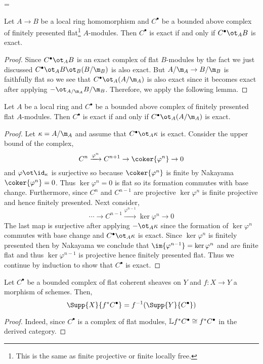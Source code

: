 =\documentclass[12pt]{article}
\begin{document}
\begin{lemma}
Let $A \to B$ be a local ring homomorphism and $C^\bullet$ be a bounded above complex of finitely presented flat\footnote{This is the same as finite projective or finite locally free.} $A$-modules. Then $C^\bullet$ is exact if and only if $C^\bullet \ot_A B$ is exact. 
\end{lemma}

\begin{proof}
Since $C^\bullet \ot_A B$ is an exact complex of flat $B$-modules by the fact we just discussed $C^\bullet \ot_A B \ot_B (B / \m_B)$ is also exact. But $A/\m_A \to B/\m_B$ is faithfully flat so we see that $C^\bullet \ot_A (A /\m_A)$ is also exact since it becomes exact after applying $- \ot_{A/\m_A} B / \m_B$. Therefore, we apply the following lemma.
\end{proof}

\begin{lemma}
Let $A$ be a local ring and $C^\bullet$ be a bounded above complex of finitely presented flat $A$-modules. Then $C^\bullet$ is exact if and only if $C^\bullet \ot_A (A/\m_A)$ is exact. 
\end{lemma}

\begin{proof}
Let $\kappa = A / \m_A$ and assume that $C^\bullet \ot_A \kappa$ is exact.
Consider the upper bound of the complex,
\[ C^n \xrightarrow{\varphi^n} C^{n+1} \to \coker{\varphi^n} \to 0 \]
and $\varphi \ot \id_\kappa$ is surjective so because $\coker{\varphi^n}$ is finite by Nakayama $\coker{\varphi^n} = 0$. Thus $\ker{\varphi^n} = 0$ is flat so its formation commutes with base change. Furthermore, since $C^n$ and $C^{n-1}$ are projective $\ker{\varphi^n}$ is finite projective and hence finitely presented. Next consider,
\[ \cdots \to C^{n-1} \xrightarrow{\varphi^{n-1}} \ker{\varphi^n} \to 0 \]
The last map is surjective after applying $- \ot_A \kappa$ since the formation of $\ker{\varphi^n}$ commutes with base change and $C^\bullet \ot_A \kappa$ is exact. Since $\ker{\varphi^n}$ is finitely presented then by Nakayama we conclude that $\im{\varphi^{n-1}} = \ker{\varphi^n}$ and are finite flat and thus $\ker{\varphi^{n-1}}$ is projective hence finitely presented flat. Thus we continue by induction to show that $C^\bullet$ is exact.
\end{proof}

\begin{cor}
Let $C^\bullet$ be a bounded complex of flat coherent sheaves on $Y$ and $f : X \to Y$ a morphism of schemes. Then,
\[ \Supp{X}{f^* C^\bullet} = f^{-1}(\Supp{Y}{C^\bullet}) \]
\end{cor}

\begin{proof}
Indeed, since $C^\bullet$ is a complex of flat modules, $\mathbb{L} f^* C^\bullet \cong f^* C^\bullet$ in the derived category.
\end{proof}
\end{document}
